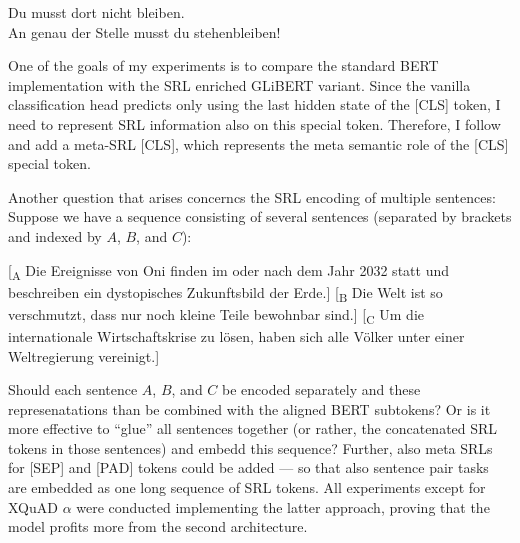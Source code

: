 \begin{examples}
  \item Du musst dort nicht bleiben.\\
        An genau der Stelle musst du stehenbleiben!

                                    
\end{examples}

One of the goals of my experiments is to compare the standard BERT implementation with the SRL
enriched GLiBERT variant. Since the vanilla classification head predicts only using the last
hidden state of the [CLS] token, I need to represent SRL information also on this special
token. Therefore, I follow \cite{zhang2019semantics} and add a meta-SRL [CLS], which represents
the meta semantic role of the [CLS] special token.

Another question that arises concerncs the SRL encoding of multiple sentences:
Suppose we have a sequence consisting of several sentences (separated by brackets and indexed by $A$, $B$, and $C$):

\begin{examples}
  \item {[}\textsubscript{A} Die Ereignisse von Oni finden im oder nach dem Jahr 2032 statt und beschreiben ein dystopisches Zukunftsbild der Erde.] [\textsubscript{B} Die Welt ist so verschmutzt, dass nur noch kleine Teile bewohnbar sind.] [\textsubscript{C} Um die internationale Wirtschaftskrise zu lösen, haben sich alle Völker unter einer Weltregierung vereinigt.]
\end{examples}

Should each sentence $A$, $B$, and $C$ be encoded separately and these represenatations than
be combined with the aligned BERT subtokens? Or is it more effective to ``glue'' all sentences
together (or rather, the concatenated SRL tokens in those sentences) and embedd this sequence?
Further, also meta SRLs for [SEP] and [PAD] tokens could be added --- so that also sentence
pair tasks are embedded as one long sequence of SRL tokens. All experiments except for XQuAD
$\alpha$ were conducted implementing the latter approach, proving that the model profits more
from the second architecture.

